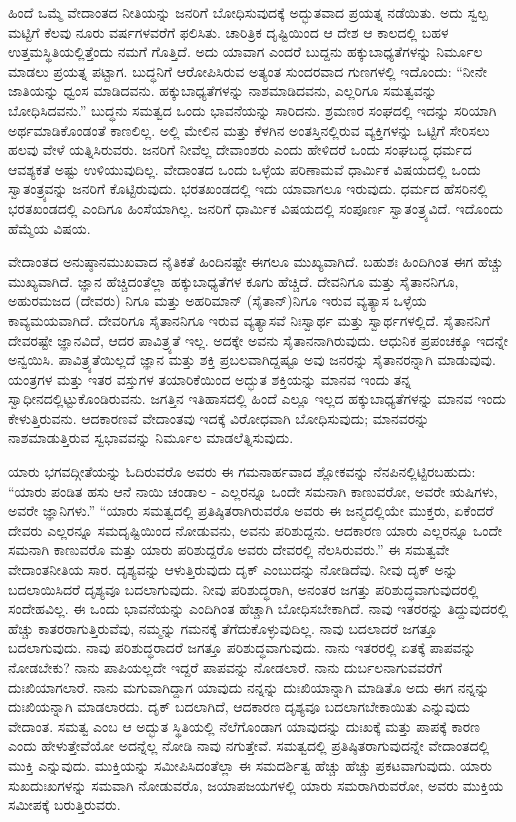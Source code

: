 ಹಿಂದೆ ಒಮ್ಮೆ ವೇದಾಂತದ ನೀತಿಯನ್ನು ಜನರಿಗೆ ಬೋಧಿಸುವುದಕ್ಕೆ ಅದ್ಭುತವಾದ ಪ್ರಯತ್ನ ನಡೆಯಿತು. ಅದು ಸ್ವಲ್ಪ ಮಟ್ಟಿಗೆ ಕೆಲವು ನೂರು ವರ್ಷಗಳವರೆಗೆ ಫಲಿಸಿತು. ಚಾರಿತ್ರಿಕ ದೃಷ್ಟಿಯಿಂದ ಆ ದೇಶ ಆ ಕಾಲದಲ್ಲಿ ಬಹಳ ಉತ್ತಮಸ್ಥಿತಿಯಲ್ಲಿತ್ತೆಂದು ನಮಗೆ ಗೊತ್ತಿದೆ. ಅದು ಯಾವಾಗ ಎಂದರೆ ಬುದ್ದನು ಹಕ್ಕುಬಾಧ್ಯತೆಗಳನ್ನು ನಿರ್ಮೂಲ ಮಾಡಲು ಪ್ರಯತ್ನ ಪಟ್ಟಾಗ. ಬುದ್ಧನಿಗೆ ಆರೋಪಿಸಿರುವ ಅತ್ಯಂತ ಸುಂದರವಾದ ಗುಣಗಳಲ್ಲಿ ಇದೊಂದು: “ನೀನೇ ಜಾತಿಯನ್ನು ಧ್ವಂಸ ಮಾಡಿದವನು. ಹಕ್ಕುಬಾಧ್ಯತೆಗಳನ್ನು ನಾಶಮಾಡಿದವನು, ಎಲ್ಲರಿಗೂ ಸಮತ್ವವನ್ನು ಬೋಧಿಸಿದವನು.” ಬುದ್ಧನು ಸಮತ್ವದ ಒಂದು ಭಾವನೆಯನ್ನು ಸಾರಿದನು. ಶ್ರಮಣರ ಸಂಘದಲ್ಲಿ ಇದನ್ನು ಸರಿಯಾಗಿ ಅರ್ಥಮಾಡಿಕೊಂಡಂತೆ ಕಾಣಲಿಲ್ಲ. ಅಲ್ಲಿ ಮೇಲಿನ ಮತ್ತು ಕೆಳಗಿನ ಅಂತಸ್ತಿನಲ್ಲಿರುವ ವ್ಯಕ್ತಿಗಳನ್ನು ಒಟ್ಟಿಗೆ ಸೇರಿಸಲು ಹಲವು ವೇಳೆ ಯತ್ನಿಸಿರುವರು. ಜನರಿಗೆ ನೀವೆಲ್ಲ ದೇವಾಂಶರು ಎಂದು ಹೇಳಿದರೆ ಒಂದು ಸಂಘಬದ್ಧ ಧರ್ಮದ ಆವಶ್ಯಕತೆ ಅಷ್ಟು ಉಳಿಯುವುದಿಲ್ಲ. ವೇದಾಂತದ ಒಂದು ಒಳ್ಳೆಯ ಪರಿಣಾಮವೆ ಧಾರ್ಮಿಕ ವಿಷಯದಲ್ಲಿ ಒಂದು ಸ್ವಾತಂತ್ರ್ಯವನ್ನು ಜನರಿಗೆ ಕೊಟ್ಟಿರುವುದು. ಭರತಖಂಡದಲ್ಲಿ ಇದು ಯಾವಾಗಲೂ ಇರುವುದು. ಧರ್ಮದ ಹೆಸರಿನಲ್ಲಿ ಭರತಖಂಡದಲ್ಲಿ ಎಂದಿಗೂ ಹಿಂಸೆಯಾಗಿಲ್ಲ. ಜನರಿಗೆ ಧಾರ್ಮಿಕ ವಿಷಯದಲ್ಲಿ ಸಂಪೂರ್ಣ ಸ್ವಾತಂತ್ರ್ಯವಿದೆ. ಇದೊಂದು ಹೆಮ್ಮೆಯ ವಿಷಯ.

ವೇದಾಂತದ ಅನುಷ್ಠಾನಮುಖವಾದ ನೈತಿಕತೆ ಹಿಂದಿನಷ್ಟೇ ಈಗಲೂ ಮುಖ್ಯವಾಗಿದೆ. ಬಹುಶಃ ಹಿಂದಿಗಿಂತ ಈಗ ಹೆಚ್ಚು ಮುಖ್ಯವಾಗಿದೆ. ಜ್ಞಾನ ಹೆಚ್ಚಿದಂತೆಲ್ಲಾ ಹಕ್ಕುಬಾಧ್ಯತೆಗಳ ಕೂಗು ಹೆಚ್ಚಿದೆ. ದೇವನಿಗೂ ಮತ್ತು ಸೈತಾನನಿಗೂ, ಅಹುರಮಜದ (ದೇವರು) ನಿಗೂ ಮತ್ತು ಅಹರಿಮಾನ್ (ಸೈತಾನ್)ನಿಗೂ ಇರುವ ವ್ಯತ್ಯಾಸ ಒಳ್ಳೆಯ ಕಾವ್ಯಮಯವಾಗಿದೆ. ದೇವರಿಗೂ ಸೈತಾನನಿಗೂ ಇರುವ ವ್ಯತ್ಯಾಸವೆ ನಿಃಸ್ವಾರ್ಥ ಮತ್ತು ಸ್ವಾರ್ಥಗಳಲ್ಲಿದೆ. ಸೈತಾನನಿಗೆ ದೇವರಷ್ಟೇ ಜ್ಞಾನವಿದೆ, ಆದರ ಪಾವಿತ್ರ್ಯತೆ ಇಲ್ಲ. ಅದಕ್ಕೇ ಅವನು ಸೈತಾನನಾಗಿರುವುದು. ಆಧುನಿಕ ಪ್ರಪಂಚಕ್ಕೂ ಇದನ್ನೇ ಅನ್ವಯಿಸಿ. ಪಾವಿತ್ರ್ಯತೆಯಿಲ್ಲದೆ ಜ್ಞಾನ ಮತ್ತು ಶಕ್ತಿ ಪ್ರಬಲವಾಗಿದ್ದಷ್ಟೂ ಅವು ಜನರನ್ನು ಸೈತಾನರನ್ನಾಗಿ ಮಾಡುವುವು. ಯಂತ್ರಗಳ ಮತ್ತು ಇತರ ವಸ್ತುಗಳ ತಯಾರಿಕೆಯಿಂದ ಅದ್ಭುತ ಶಕ್ತಿಯನ್ನು ಮಾನವ ಇಂದು ತನ್ನ ಸ್ವಾಧೀನದಲ್ಲಿಟ್ಟುಕೊಂಡಿರುವನು. ಜಗತ್ತಿನ ಇತಿಹಾಸದಲ್ಲಿ ಹಿಂದೆ ಎಲ್ಲೂ ಇಲ್ಲದ ಹಕ್ಕುಬಾಧ್ಯತೆಗಳನ್ನು ಮಾನವ ಇಂದು ಕೇಳುತ್ತಿರುವನು. ಆದಕಾರಣವೆ ವೇದಾಂತವು ಇದಕ್ಕೆ ವಿರೋಧವಾಗಿ ಬೋಧಿಸುವುದು; ಮಾನವರನ್ನು ನಾಶಮಾಡುತ್ತಿರುವ ಸ್ವಭಾವವನ್ನು ನಿರ್ಮೂಲ ಮಾಡಲೆತ್ನಿಸುವುದು.

ಯಾರು ಭಗವದ್ಗೀತೆಯನ್ನು ಓದಿರುವರೊ ಅವರು ಈ ಗಮನಾರ್ಹವಾದ ಶ್ಲೋಕವನ್ನು ನೆನಪಿನಲ್ಲಿಟ್ಟಿರಬಹುದು: “ಯಾರು ಪಂಡಿತ ಹಸು ಆನೆ ನಾಯಿ ಚಂಡಾಲ - ಎಲ್ಲರನ್ನೂ ಒಂದೇ ಸಮನಾಗಿ ಕಾಣುವರೋ, ಅವರೇ ಋಷಿಗಳು, ಅವರೇ ಜ್ಞಾನಿಗಳು.” “ಯಾರು ಸಮತ್ವದಲ್ಲಿ ಪ್ರತಿಷ್ಠಿತರಾಗಿರುವರೊ ಅವರು ಈ ಜನ್ಮದಲ್ಲಿಯೇ ಮುಕ್ತರು, ಏಕೆಂದರೆ ದೇವರು ಎಲ್ಲರನ್ನೂ ಸಮದೃಷ್ಟಿಯಿಂದ ನೋಡುವನು, ಅವನು ಪರಿಶುದ್ದನು. ಆದಕಾರಣ ಯಾರು ಎಲ್ಲರನ್ನೂ ಒಂದೇ ಸಮನಾಗಿ ಕಾಣುವರೊ ಮತ್ತು ಯಾರು ಪರಿಶುದ್ದರೊ ಅವರು ದೇವರಲ್ಲಿ ನೆಲಸಿರುವರು.” ಈ ಸಮತ್ವವೇ ವೇದಾಂತನೀತಿಯ ಸಾರ. ದೃಶ್ಯವನ್ನು ಆಳುತ್ತಿರುವುದು ದೃಕ್ ಎಂಬುದನ್ನು ನೋಡಿದೆವು. ನೀವು ದೃಕ್ ಅನ್ನು ಬದಲಾಯಿಸಿದರೆ ದೃಶ್ಯವೂ ಬದಲಾಗುವುದು. ನೀವು ಪರಿಶುದ್ಧರಾಗಿ, ಅನಂತರ ಜಗತ್ತು ಪರಿಶುದ್ಧವಾಗುವುದರಲ್ಲಿ ಸಂದೇಹವಿಲ್ಲ. ಈ ಒಂದು ಭಾವನೆಯನ್ನು ಎಂದಿಗಿಂತ ಹೆಚ್ಚಾಗಿ ಬೋಧಿಸಬೇಕಾಗಿದೆ. ನಾವು ಇತರರನ್ನು ತಿದ್ದುವುದರಲ್ಲಿ ಹೆಚ್ಚು ಕಾತರರಾಗುತ್ತಿರುವೆವು, ನಮ್ಮನ್ನು ಗಮನಕ್ಕೆ ತೆಗೆದುಕೊಳ್ಳುವುದಿಲ್ಲ. ನಾವು ಬದಲಾದರೆ ಜಗತ್ತೂ ಬದಲಾಗುವುದು. ನಾವು ಪರಿಶುದ್ಧರಾದರೆ ಜಗತ್ತೂ ಪರಿಶುದ್ಧವಾಗುವುದು. ನಾನು ಇತರರಲ್ಲಿ ಏತಕ್ಕೆ ಪಾಪವನ್ನು ನೋಡಬೇಕು? ನಾನು ಪಾಪಿಯಲ್ಲದೇ ಇದ್ದರೆ ಪಾಪವನ್ನು ನೋಡಲಾರೆ. ನಾನು ದುರ್ಬಲನಾಗುವವರೆಗೆ ದುಃಖಿಯಾಗಲಾರೆ. ನಾನು ಮಗುವಾಗಿದ್ದಾಗ ಯಾವುದು ನನ್ನನ್ನು ದುಃಖಿಯಾನ್ನಾಗಿ ಮಾಡಿತೊ ಅದು ಈಗ ನನ್ನನ್ನು ದುಃಖಿಯನ್ನಾಗಿ ಮಾಡಲಾರದು. ದೃಕ್ ಬದಲಾಗಿದೆ, ಆದಕಾರಣ ದೃಶ್ಯವೂ ಬದಲಾಗಬೇಕಾಯಿತು ಎನ್ನುವುದು ವೇದಾಂತ. ಸಮತ್ವ ಎಂಬ ಆ ಅದ್ಭುತ ಸ್ಥಿತಿಯಲ್ಲಿ ನೆಲೆಗೊಂಡಾಗ ಯಾವುದನ್ನು ದುಃಖಕ್ಕೆ ಮತ್ತು ಪಾಪಕ್ಕೆ ಕಾರಣ ಎಂದು ಹೇಳುತ್ತೇವೆಯೋ ಅದನ್ನೆಲ್ಲ ನೋಡಿ ನಾವು ನಗುತ್ತೇವೆ. ಸಮತ್ವದಲ್ಲಿ ಪ್ರತಿಷ್ಠಿತರಾಗುವುದನ್ನೇ ವೇದಾಂತದಲ್ಲಿ ಮುಕ್ತಿ ಎನ್ನುವುದು. ಮುಕ್ತಿಯನ್ನು ಸಮೀಪಿಸಿದಂತೆಲ್ಲಾ ಈ ಸಮದರ್ಶಿತ್ವ ಹೆಚ್ಚು ಹೆಚ್ಚು ಪ್ರಕಟವಾಗುವುದು. ಯಾರು ಸುಖದುಃಖಗಳನ್ನು ಸಮವಾಗಿ ನೋಡುವರೊ, ಜಯಾಪಜಯಗಳಲ್ಲಿ ಯಾರು ಸಮರಾಗಿರುವರೋ, ಅವರು ಮುಕ್ತಿಯ ಸಮೀಪಕ್ಕೆ ಬರುತ್ತಿರುವರು.

